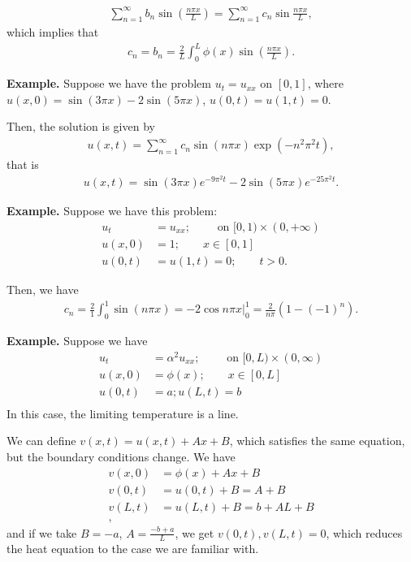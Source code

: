\documentclass{article}
\begin{document}
\begin{align*}
  \sum_{n=1}^{\infty} b_n \sin \left( \frac{n \pi x}{L} \right) = \sum_{n=1}^{\infty} c_n \sin \frac{n \pi x}{L},
\end{align*}
which implies that 
\begin{align*}
  c_n = b_n = \frac{2}{L} \int_{0}^{L} \phi(x) \sin \left( \frac{n \pi x}{L} \right).
\end{align*}

{\bf Example.} Suppose we have the problem $u_t = u_{xx}$ on $[0, 1]$, where $u(x, 0) = \sin (3 \pi x) - 2 \sin (5 \pi x)$, $u(0, t) = u(1, t) = 0$.

Then, the solution is given by
\begin{align*}
  u(x, t) = \sum_{n=1}^{\infty} c_n \sin (n \pi x) \exp \left( - n^2 \pi^2 t \right),
\end{align*}
that is
\begin{align*}
  u(x, t) = \sin (3 \pi x) e^{-9 \pi^2 t} - 2 \sin (5 \pi x ) e^{- 25 \pi^2 t}.
\end{align*}

{\bf Example.} Suppose we have this problem:
\begin{align*}
  u_t &= u_{xx}; \qquad \text{ on } [0, 1) \times (0, + \infty) \\
  u(x, 0) &= 1; \qquad x \in [0, 1] \\
  u(0, t) &= u(1, t) = 0; \qquad t > 0.
\end{align*}

Then, we have
\begin{align*}
  c_n = \frac{2}{1} \int_{0}^{1} \sin (n \pi x) = \left . - 2 \cos n \pi x \right |_{0}^{1} = \frac{2}{n \pi}  \left( 1 - (-1)^n \right).
\end{align*}

{\bf Example.} Suppose we have
\begin{align*}
  u_t &= \alpha^2 u_{xx}; \qquad \text{ on } [0, L) \times  (0, \infty) \\
  u(x, 0) &= \phi(x); \qquad x \in [0, L] \\
  u(0, t) &= a; u(L, t) = b \\
\end{align*}
In this case, the limiting temperature is a line.

We can define $v(x, t) = u(x, t) + A x + B$, which satisfies the same equation, but the boundary conditions change.  We have
\begin{align*}
  v(x, 0) &= \phi(x) + A x + B \\
  v(0, t) &= u(0, t) + B = A + B \\
  v(L, t) &= u(L, t) + B = b + AL + B \\,
\end{align*}
and if we take $B = -a$, $A = \frac{- b + a}{L}$, we get $v(0, t), v(L, t) = 0$, which reduces the heat equation to the case we are familiar with.
\end{document}

